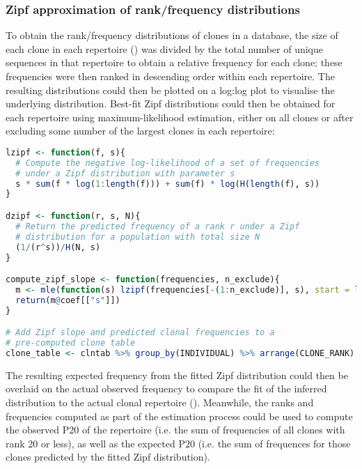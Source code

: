 \subsubsection{Zipf approximation of rank/frequency distributions}
\label{sec:methods_comp_igdownstream_zipf}

To obtain the rank/frequency distributions of clones in a  database, the size of each clone in each repertoire () was divided by the total number of unique sequences in that repertoire to obtain a relative frequency for each clone; these frequencies were then ranked in descending order within each repertoire. The resulting distributions could then be plotted on a log:log plot to visualise the underlying distribution. Best-fit Zipf distributions could then be obtained for each repertoire using maximum-likelihood estimation, either on all clones or after excluding some number of the largest clones in each repertoire:

\begin{lstlisting}[language=R]
lzipf <- function(f, s){
  # Compute the negative log-likelihood of a set of frequencies
  # under a Zipf distribution with parameter s
  s * sum(f * log(1:length(f))) + sum(f) * log(H(length(f), s))
}

dzipf <- function(r, s, N){
  # Return the predicted frequency of a rank r under a Zipf 
  # distribution for a population with total size N
  (1/(r^s))/H(N, s)
}

compute_zipf_slope <- function(frequencies, n_exclude){
  m <- mle(function(s) lzipf(frequencies[-(1:n_exclude)], s), start = list(s=1))
  return(m@coef[["s"]])
}

# Add Zipf slope and predicted clonal frequencies to a
# pre-computed clone table
clone_table <- clntab %>% group_by(INDIVIDUAL) %>% arrange(CLONE_RANK) %>% mutate(S = compute_zipf_slope(CLONE_SIZE, n_exclude), EXP_FREQUENCY = dzipf(CLONE_RANK, S, n()), EXP_SIZE = sum(CLONE_SIZE) * EXP_FREQUENCY))
\end{lstlisting}

\noindent The resulting expected frequency from the fitted Zipf distribution could then be overlaid on the actual observed frequency to compare the fit of the inferred distribution to the actual clonal repertoire (). Meanwhile, the ranks and frequencies computed as part of the estimation process could be used to compute the observed P20 of the repertoire (i.e. the sum of frequencies of all clones with rank 20 or less), as well as the expected P20 (i.e. the sum of frequences for those clones predicted by the fitted Zipf distribution).


